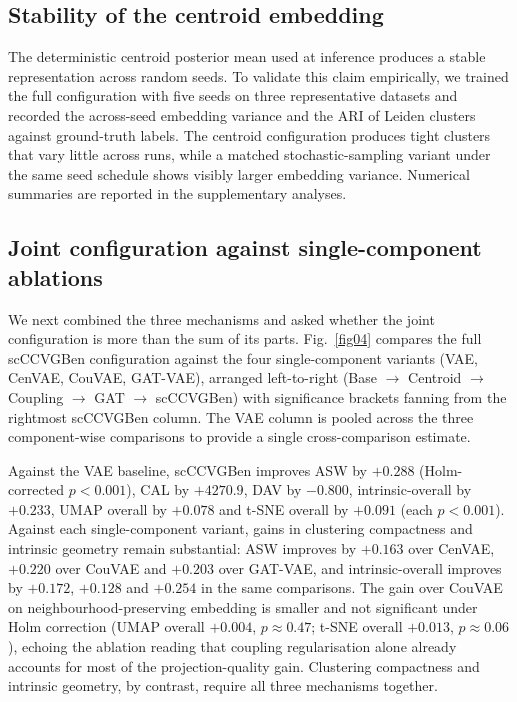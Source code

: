 \documentclass[referee, pdflatex, sn-vancouver-num]{sn-jnl}
\begin{document}
\subsection{Stability of the centroid embedding}\label{sec:stability}
The deterministic centroid posterior mean used at inference produces a stable representation across random seeds. To validate this claim empirically, we trained the full configuration with five seeds on three representative datasets and recorded the across-seed embedding variance and the ARI of Leiden clusters against ground-truth labels. The centroid configuration produces tight clusters that vary little across runs, while a matched stochastic-sampling variant under the same seed schedule shows visibly larger embedding variance. Numerical summaries are reported in the supplementary analyses.

\subsection{Joint configuration against single-component ablations}\label{sec:flagship}

We next combined the three mechanisms and asked whether the joint configuration is more than the sum of its parts. Fig.~\ref{fig04} compares the full scCCVGBen configuration against the four single-component variants (VAE, CenVAE, CouVAE, GAT-VAE), arranged left-to-right (Base $\rightarrow$ Centroid $\rightarrow$ Coupling $\rightarrow$ GAT $\rightarrow$ scCCVGBen) with significance brackets fanning from the rightmost scCCVGBen column. The VAE column is pooled across the three component-wise comparisons to provide a single cross-comparison estimate.

Against the VAE baseline, scCCVGBen improves ASW by $+0.288$ (Holm-corrected $p<0.001$), CAL by $+4270.9$, DAV by $-0.800$, intrinsic-overall by $+0.233$, UMAP overall by $+0.078$ and t-SNE overall by $+0.091$ (each $p<0.001$). Against each single-component variant, gains in clustering compactness and intrinsic geometry remain substantial: ASW improves by $+0.163$ over CenVAE, $+0.220$ over CouVAE and $+0.203$ over GAT-VAE, and intrinsic-overall improves by $+0.172$, $+0.128$ and $+0.254$ in the same comparisons. The gain over CouVAE on neighbourhood-preserving embedding is smaller and not significant under Holm correction (UMAP overall $+0.004$, $p\approx 0.47$; t-SNE overall $+0.013$, $p\approx 0.06$), echoing the ablation reading that coupling regularisation alone already accounts for most of the projection-quality gain. Clustering compactness and intrinsic geometry, by contrast, require all three mechanisms together.
\end{document}
